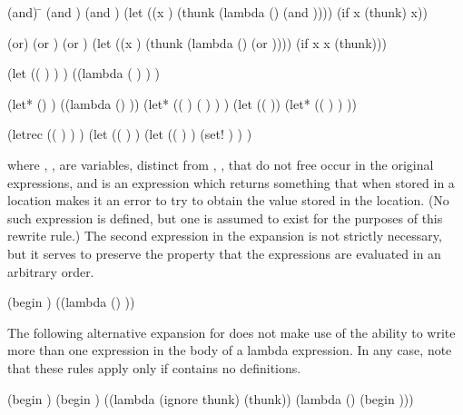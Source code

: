 \begin{schemenoindent}
(and)         \=\iet  \schtrue
(and )\>\iet  {}
(and   \dotsfoo)
\iet  (let ((x )
            (thunk (lambda () (and  \dotsfoo))))
        (if x (thunk) x))

(or)          \>\iet  \schfalse
(or )\>\iet  {}
(or   \dotsfoo)
\iet  (let ((x )
            (thunk (lambda () (or  \dotsfoo))))
        (if x x (thunk)))

(let (( ) \dotsfoo)
  )
\iet  ((lambda ( \dotsfoo) )  \dotsfoo)

(let* () )
\iet  ((lambda () ))
(let* (( )
       ( )
       \dotsfoo)
  )
\iet  (let (( )) 
        (let* (( )
               \dotsfoo)
          ))

(letrec (( )
         \dotsfoo)
  )
\iet  (let (( )
            \dotsfoo)
         (let (( )
               \dotsfoo)
           (set!  )
           \dotsfoo)
         )%
\end{schemenoindent}
where , , \dotsfoo{} are variables, distinct
from , \dotsfoo{}, that do not free occur in the
original  expressions, and  is an expression
which returns something that when stored in a location makes it an
error to try to obtain the value stored in the location.  (No such
expression is defined, but one is assumed to exist for the purposes of this
rewrite rule.)  The second  expression in the expansion is not
strictly necessary, but it serves to preserve the property that the
 expressions are evaluated in an arbitrary order.


\begin{schemenoindent}

(begin )
\iet  ((lambda () ))%
\end{schemenoindent}
The following alternative expansion for  does not make use of
the ability to write more than one expression in the body of a lambda
expression.  In any case, note that these rules apply only if
 contains no definitions.
\begin{schemenoindent}
(begin )\iet  {}
(begin  )
\iet  ((lambda (ignore thunk) (thunk))
       (lambda () (begin )))%
\end{schemenoindent}

